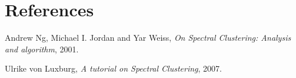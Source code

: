 \documentclass[12pt, a4paper]{article}
\begin{document}
\section*{References}
\begin{thebibliography}{2}

  Andrew Ng, Michael I. Jordan and Yar Weiss,
  \emph{On Spectral Clustering: Analysis and algorithm},
  2001.

  Ulrike von Luxburg,
  \emph{A tutorial on Spectral Clustering},
  2007.

\end{thebibliography}
\end{document}
